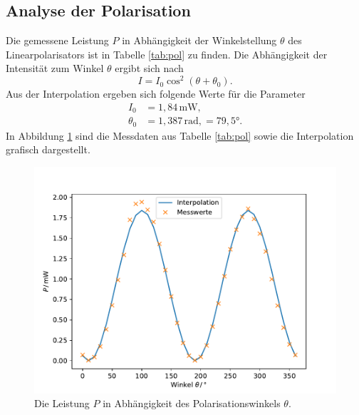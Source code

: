 \subsection{Analyse der Polarisation}
Die gemessene Leistung $P$ in Abhängigkeit der Winkelstellung $\theta$ des Linearpolarisators ist in Tabelle \ref{tab:pol} zu finden.
Die Abhängigkeit der Intensität zum Winkel $\theta$ ergibt sich nach
\begin{equation}
    I=I_0\cos^2(\theta+\theta_0).
\end{equation}
Aus der Interpolation ergeben sich folgende Werte für die Parameter
\begin{align*}
    I_0&=1,84\,\text{mW}{,}\\
    \theta_0&=1,387\,\text{rad}{,}=79,5°.
\end{align*}
In Abbildung \ref{fig:pol} sind die Messdaten aus Tabelle \ref{tab:pol} sowie die Interpolation grafisch dargestellt.
\begin{figure}
    \center
    \includegraphics[width=\textwidth]{plots/pol.pdf}
    \caption{Die Leistung $P$ in Abhängigkeit des Polarisationswinkels $\theta$.}
    \label{fig:pol}
\end{figure}
